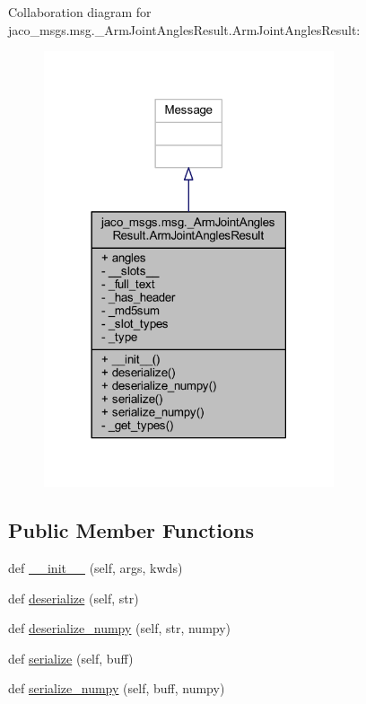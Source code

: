 Collaboration diagram for jaco\+\_\+msgs.\+msg.\+\_\+\+Arm\+Joint\+Angles\+Result.\+Arm\+Joint\+Angles\+Result\+:
\nopagebreak
\begin{figure}[H]
\begin{center}
\leavevmode
\includegraphics[width=242pt]{db/d70/classjaco__msgs_1_1msg_1_1__ArmJointAnglesResult_1_1ArmJointAnglesResult__coll__graph}
\end{center}
\end{figure}
\subsection*{Public Member Functions}
\begin{DoxyCompactItemize}
\item 
def \hyperlink{classjaco__msgs_1_1msg_1_1__ArmJointAnglesResult_1_1ArmJointAnglesResult_a6584c0dc3193587ef66dc2ead0fc19c3}{\+\_\+\+\_\+init\+\_\+\+\_\+} (self, args, kwds)
\item 
def \hyperlink{classjaco__msgs_1_1msg_1_1__ArmJointAnglesResult_1_1ArmJointAnglesResult_a1f5d148618726c09d27933b2240f6158}{deserialize} (self, str)
\item 
def \hyperlink{classjaco__msgs_1_1msg_1_1__ArmJointAnglesResult_1_1ArmJointAnglesResult_a7089a93594cfb7a4d03dc544fe3646f3}{deserialize\+\_\+numpy} (self, str, numpy)
\item 
def \hyperlink{classjaco__msgs_1_1msg_1_1__ArmJointAnglesResult_1_1ArmJointAnglesResult_a373f115e57d7582cdf4fb0a3167e6dd2}{serialize} (self, buff)
\item 
def \hyperlink{classjaco__msgs_1_1msg_1_1__ArmJointAnglesResult_1_1ArmJointAnglesResult_abfad62b1ce5716bc0077df2c8efd8ade}{serialize\+\_\+numpy} (self, buff, numpy)
\end{DoxyCompactItemize}
